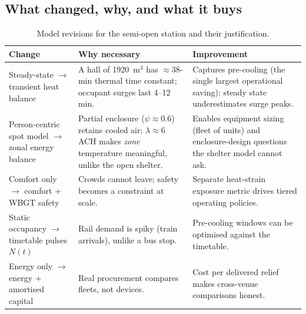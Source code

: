 \documentclass[11pt]{article}
\begin{document}
\subsection{What changed, why, and what it buys}
\begin{table}[H]\centering\small
\caption{Model revisions for the semi-open station and their justification.}\label{tab:rev}
\begin{tabular}{@{}p{3.4cm}p{4.6cm}p{6.6cm}@{}}
\toprule
Change & Why necessary & Improvement\\
\midrule
Steady-state $\to$ transient heat balance & A hall of 1920~m$^3$ has $\approx$38-min thermal time constant; occupant surges last 4--12 min. & Captures pre-cooling (the single largest operational saving); steady state underestimates surge peaks.\\
Person-centric spot model $\to$ zonal energy balance & Partial enclosure ($\psi\approx0.6$) retains cooled air; $\lambda\approx6$ ACH makes \emph{zone} temperature meaningful, unlike the open shelter. & Enables equipment sizing (fleet of units) and enclosure-design questions the shelter model cannot ask.\\
Comfort only $\to$ comfort + WBGT safety & Crowds cannot leave; safety becomes a constraint at scale. & Separate heat-strain exposure metric drives tiered operating policies.\\
Static occupancy $\to$ timetable pulses $N(t)$ & Rail demand is spiky (train arrivals), unlike a bus stop. & Pre-cooling windows can be optimised against the timetable.\\
Energy only $\to$ energy + amortised capital & Real procurement compares fleets, not devices. & Cost per delivered relief makes cross-venue comparisons honest.\\
\bottomrule
\end{tabular}
\end{table}
\end{document}
